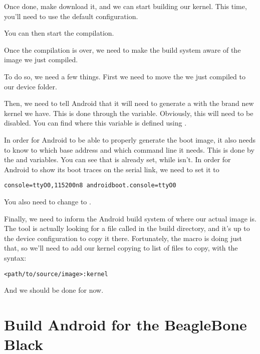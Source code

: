 Once done, make  download it, and we can start building our
kernel. This time, you'll need to use the 
default configuration.

You can then start the compilation.

Once the compilation is over, we need to make the build system aware
of the image we just compiled.

To do so, we need a few things. First we need to move the
 we just compiled to our device folder.

Then, we need to tell Android that it will need to generate a
 with the brand new kernel we have. This is done
through the  variable. Obviously, this will
need to be disabled. You can find where this variable is defined using
.

In order for Android to be able to properly generate the boot image,
it also needs to know to which base address and which command line it
needs. This is done by the  and
 variables. You can see that
 is already set, while
 isn't. In order for Android to show its
boot traces on the serial link, we need to set it to

\begin{verbatim}
console=ttyO0,115200n8 androidboot.console=ttyO0
\end{verbatim}

You also need to change  to .

Finally, we need to inform the Android build system of where our
actual image is. The  tool is actually looking for a
file called  in the build directory, and it's up to the
device configuration to copy it there. Fortunately, the
 macro is doing just that, so we'll need to
add our kernel copying to list of files to copy, with the syntax:

\begin{verbatim}
<path/to/source/image>:kernel
\end{verbatim}

And we should be done for now.

\section{Build Android for the BeagleBone Black}

